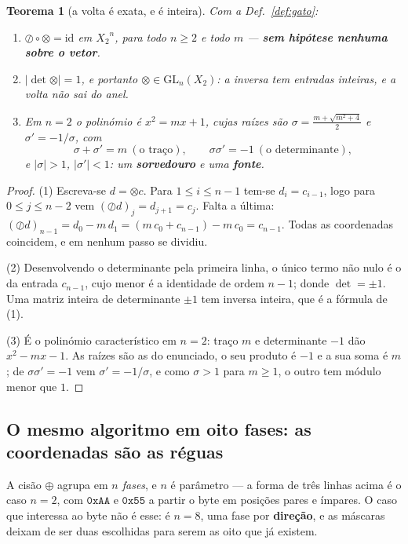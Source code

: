\documentclass[11pt,a4paper]{article}
\newcommand{\Zc}{\ensuremath{X_2}}
\newtheorem{teorema}{Teorema}
\begin{document}
\begin{teorema}[a volta é exata, e é inteira]\label{thm:gato}
Com a Def.~\ref{def:gato}:
\begin{enumerate}\itemsep3pt
\item[(1)] $\oslash\circ\otimes=\mathrm{id}$ em $\Zc^{n}$, para todo $n\ge2$ e
todo $m$ --- \textbf{sem hipótese nenhuma sobre o vetor}.
\item[(2)] $\lvert\det\otimes\rvert=1$, e portanto $\otimes\in\mathrm{GL}_n(\Zc)$:
a inversa tem entradas \emph{inteiras}, e a volta não sai do anel.
\item[(3)] Em $n=2$ o polinómio é $x^{2}=mx+1$, cujas raízes são
$\sigma=\tfrac{m+\sqrt{m^{2}+4}}2$ e $\sigma'=-1/\sigma$, com
\[
\sigma+\sigma'=m\ (\text{o traço}),\qquad \sigma\sigma'=-1\ (\text{o determinante}),
\]
e $\lvert\sigma\rvert>1$, $\lvert\sigma'\rvert<1$: um \textbf{sorvedouro} e uma
\textbf{fonte}.
\end{enumerate}
\end{teorema}

\begin{proof}
(1) Escreva-se $d=\otimes c$. Para $1\le i\le n-1$ tem-se $d_i=c_{i-1}$, logo
para $0\le j\le n-2$ vem $(\oslash d)_j=d_{j+1}=c_j$. Falta a última:
$(\oslash d)_{n-1}=d_0-m\,d_1=(m\,c_0+c_{n-1})-m\,c_0=c_{n-1}$. Todas as
coordenadas coincidem, e em nenhum passo se dividiu.

(2) Desenvolvendo o determinante pela primeira linha, o único termo não nulo é o
da entrada $c_{n-1}$, cujo menor é a identidade de ordem $n-1$; donde
$\det=\pm1$. Uma matriz inteira de determinante $\pm1$ tem inversa inteira, que
é a fórmula de (1).

(3) É o polinómio característico em $n=2$: traço $m$ e determinante $-1$ dão
$x^{2}-mx-1$. As raízes são as do enunciado, o seu produto é $-1$ e a sua soma é
$m$; de $\sigma\sigma'=-1$ vem $\sigma'=-1/\sigma$, e como $\sigma>1$ para
$m\ge1$, o outro tem módulo menor que $1$.
\end{proof}

\subsection*{O mesmo algoritmo em oito fases: as coordenadas são as réguas}

\noindent A cisão $\oplus$ agrupa em \emph{$n$ fases}, e $n$ é parâmetro --- a
forma de três linhas acima é o caso $n=2$, com $\mathtt{0xAA}$ e $\mathtt{0x55}$
a partir o byte em posições pares e ímpares. O caso que interessa ao byte não é
esse: é $n=8$, uma fase por \textbf{direção}, e as máscaras deixam de ser duas
escolhidas para serem as oito que já existem.
\end{document}
